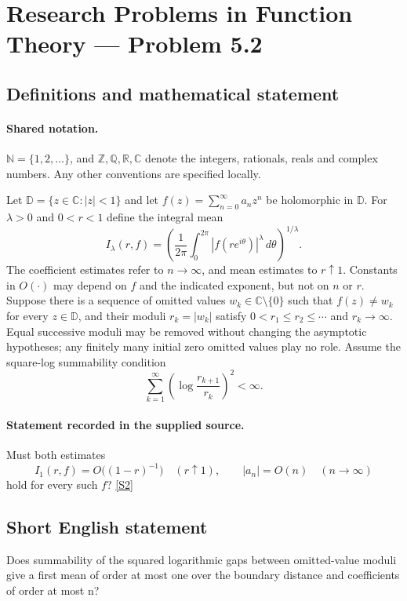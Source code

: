 \documentclass[11pt]{book}
\newcommand{\sref}[2]{\hyperlink{source:#1:#2}{[S#2]}}
\begin{document}
\section{Research Problems in Function Theory — Problem 5.2}\label{statement}

\subsection{Definitions and mathematical statement}

\paragraph{Shared notation.}$\mathbb N=\{1,2,\ldots\}$, and $\mathbb Z,\mathbb Q,\mathbb R,\mathbb C$ denote the integers, rationals, reals and complex numbers. Any other conventions are specified locally.


Let $\mathbb D=\{z\in\mathbb C:|z|<1\}$ and let $f(z)=\sum_{n=0}^\infty a_nz^n$ be holomorphic in $\mathbb D$. For $\lambda>0$ and $0<r<1$ define the integral mean
\[I_\lambda(r,f)=\left(\frac1{2\pi}\int_0^{2\pi}|f(re^{i\theta})|^\lambda\,d\theta\right)^{1/\lambda}.
\]
The coefficient estimates refer to $n\to\infty$, and mean estimates to $r\uparrow1$. Constants in $O(\cdot)$ may depend on $f$ and the indicated exponent, but not on $n$ or $r$.
Suppose there is a sequence of omitted values $w_k\in\mathbb C\setminus\{0\}$ such that $f(z)\ne w_k$ for every $z\in\mathbb D$, and their moduli $r_k=|w_k|$ satisfy $0<r_1\le r_2\le\cdots$ and $r_k\to\infty$. Equal successive moduli may be removed without changing the asymptotic hypotheses; any finitely many initial zero omitted values play no role. Assume the square-log summability condition
\[\sum_{k=1}^\infty\left(\log\frac{r_{k+1}}{r_k}\right)^2<\infty.
\]
\paragraph{Statement recorded in the supplied source.}
Must both estimates
\[I_1(r,f)=O\bigl((1-r)^{-1}\bigr)\quad(r\uparrow1),\qquad |a_n|=O(n)\quad(n\to\infty)
\]
hold for every such $f$? \sref{statement}{2}
\subsection{Short English statement}
Does summability of the squared logarithmic gaps between omitted-value moduli give a first mean of order at most one over the boundary distance and coefficients of order at most n?
\end{document}
